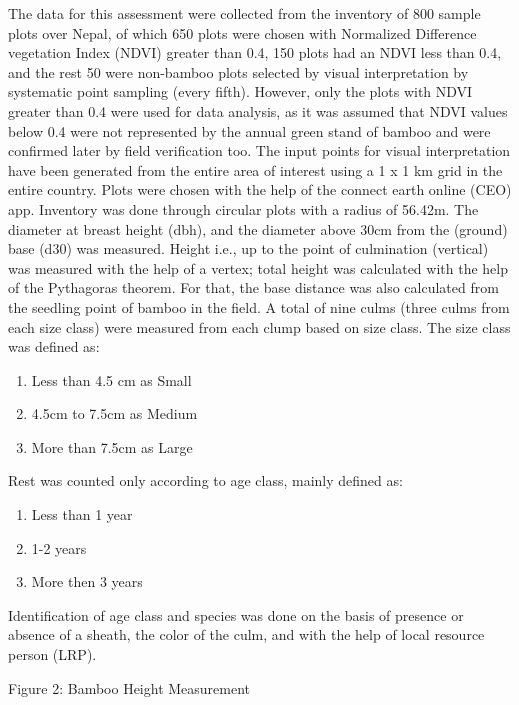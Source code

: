 \documentclass[preprint, 3p,
authoryear]{elsarticle} %
\begin{document}
The data for this assessment were collected from the inventory of 800
sample plots over Nepal, of which 650 plots were chosen with Normalized
Difference vegetation Index (NDVI) greater than 0.4, 150 plots had an
NDVI less than 0.4, and the rest 50 were non-bamboo plots selected by
visual interpretation by systematic point sampling (every fifth).
However, only the plots with NDVI greater than 0.4 were used for data
analysis, as it was assumed that NDVI values below 0.4 were not
represented by the annual green stand of bamboo and were confirmed later
by field verification too. The input points for visual interpretation
have been generated from the entire area of interest using a 1 x 1 km
grid in the entire country. Plots were chosen with the help of the
connect earth online (CEO) app. Inventory was done through circular
plots with a radius of 56.42m. The diameter at breast height (dbh), and
the diameter above 30cm from the (ground) base (d30) was measured.
Height i.e., up to the point of culmination (vertical) was measured with
the help of a vertex; total height was calculated with the help of the
Pythagoras theorem. For that, the base distance was also calculated from
the seedling point of bamboo in the field. A total of nine culms (three
culms from each size class) were measured from each clump based on size
class. The size class was defined as:

\begin{enumerate}
\def\labelenumi{\alph{enumi}.}
\item
  Less than 4.5 cm as Small
\item
  4.5cm to 7.5cm as Medium
\item
  More than 7.5cm as Large
\end{enumerate}

Rest was counted only according to age class, mainly defined as:

\begin{enumerate}
\def\labelenumi{\alph{enumi}.}
\item
  Less than 1 year
\item
  1-2 years
\item
  More then 3 years
\end{enumerate}

Identification of age class and species was done on the basis of
presence or absence of a sheath, the color of the culm, and with the
help of local resource person (LRP).

Figure 2: Bamboo Height Measurement
\end{document}
